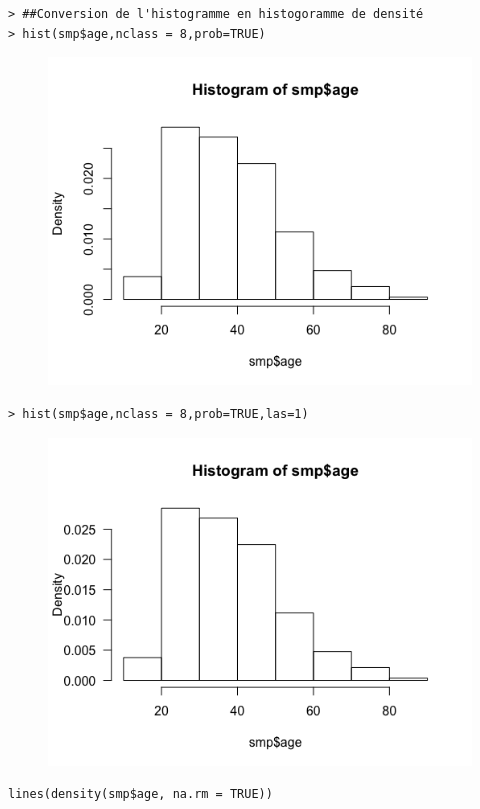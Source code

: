 \begin{lstlisting}[language=html]
> ##Conversion de l'histogramme en histogoramme de densité
> hist(smp$age,nclass = 8,prob=TRUE)
\end{lstlisting}

\begin{figure}[H]\begin{center}\includegraphics[scale=1]{ilu/lab2-6.png}\end{center}\end{figure}

\begin{lstlisting}[language=html]
> hist(smp$age,nclass = 8,prob=TRUE,las=1)
\end{lstlisting}

\begin{figure}[H]\begin{center}\includegraphics[scale=1]{ilu/lab2-7.png}\end{center}\end{figure}
\begin{lstlisting}[language=html]
lines(density(smp$age, na.rm = TRUE))
\end{lstlisting}

